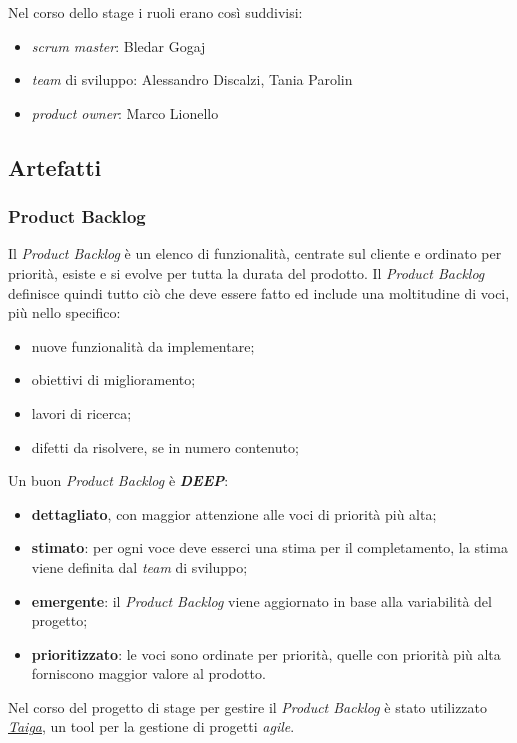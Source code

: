 Nel corso dello stage i ruoli erano così suddivisi:
\begin{itemize}
    \item \textit{scrum master}: Bledar Gogaj
    \item \textit{team} di sviluppo: Alessandro Discalzi, Tania Parolin
    \item \textit{product owner}: Marco Lionello
\end{itemize}

\subsection{Artefatti}

\subsubsection{Product Backlog}
Il \textit{Product Backlog} è un elenco di funzionalità, centrate sul cliente e ordinato per priorità, esiste e si evolve per tutta la durata del prodotto. Il \textit{Product Backlog} definisce quindi tutto ciò che deve essere fatto ed include una moltitudine di voci, più nello specifico:
\begin{itemize}
    \item nuove funzionalità da implementare;
    \item obiettivi di miglioramento;
    \item lavori di ricerca;
    \item difetti da risolvere, se in numero contenuto;
\end{itemize}
Un buon \textit{Product Backlog} è \textit{\textbf{DEEP}}:
\begin{itemize}
    \item \textbf{dettagliato}, con maggior attenzione alle voci di priorità più alta;
    \item \textbf{stimato}: per ogni voce deve esserci una stima per il completamento, la stima viene definita dal \textit{team} di sviluppo;
    \item \textbf{emergente}: il \textit{Product Backlog} viene aggiornato in base alla variabilità del progetto;
    \item \textbf{prioritizzato}: le voci sono ordinate per priorità, quelle con priorità più alta forniscono maggior valore al prodotto.
\end{itemize}
Nel corso del progetto di stage per gestire il \textit{Product Backlog} è stato utilizzato \textit{\href{https://taiga.io/}{Taiga}}, un tool per la gestione di progetti \textit{agile}.
